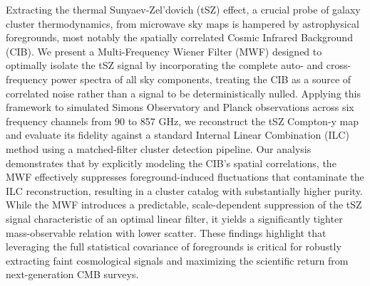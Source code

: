 \documentclass[]{article}
\begin{document}
Extracting the thermal Sunyaev-Zel'dovich (tSZ) effect, a crucial probe of galaxy cluster thermodynamics, from microwave sky maps is hampered by astrophysical foregrounds, most notably the spatially correlated Cosmic Infrared Background (CIB). We present a Multi-Frequency Wiener Filter (MWF) designed to optimally isolate the tSZ signal by incorporating the complete auto- and cross-frequency power spectra of all sky components, treating the CIB as a source of correlated noise rather than a signal to be deterministically nulled. Applying this framework to simulated Simons Observatory and Planck observations across six frequency channels from 90 to 857 GHz, we reconstruct the tSZ Compton-y map and evaluate its fidelity against a standard Internal Linear Combination (ILC) method using a matched-filter cluster detection pipeline. Our analysis demonstrates that by explicitly modeling the CIB's spatial correlations, the MWF effectively suppresses foreground-induced fluctuations that contaminate the ILC reconstruction, resulting in a cluster catalog with substantially higher purity. While the MWF introduces a predictable, scale-dependent suppression of the tSZ signal characteristic of an optimal linear filter, it yields a significantly tighter mass-observable relation with lower scatter. These findings highlight that leveraging the full statistical covariance of foregrounds is critical for robustly extracting faint cosmological signals and maximizing the scientific return from next-generation CMB surveys.
\end{document}
